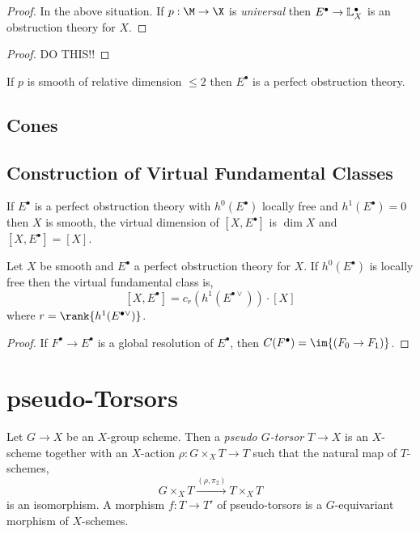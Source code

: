 \documentclass[12pt]{article}
\begin{document}
\begin{proof}
In the above situation. If $p : \M \to \X$ is \textit{universal} then $E^\bullet \to \mathbb{L}^\bullet_X$ is an obstruction theory for $X$.
\end{proof}

\begin{proof}
DO THIS!!
\end{proof}

\begin{cor}
If $p$ is smooth of relative dimension $\le 2$ then $E^\bullet$ is a perfect obstruction theory. 
\end{cor}
\subsection{Cones}

\subsection{Construction of Virtual Fundamental Classes}


\begin{prop}
If $E^\bullet$ is a perfect obstruction theory with $h^0(E^\bullet)$ locally free and $h^1(E^\bullet) = 0$ then $X$ is smooth, the virtual dimension of $[X, E^\bullet]$ is $\dim{X}$ and $[X, E^\bullet] = [X]$.
\end{prop}

\begin{prop}
Let $X$ be smooth and $E^\bullet$ a perfect obstruction theory for $X$. If $h^0(E^\bullet)$ is locally free then the virtual fundamental class is,
\[ [X, E^\bullet] = c_r(h^1(E^{\bullet \vee})) \cdot [X] \]
where $r = \rank{h^1(E^{\bullet \vee})}$.
\end{prop}

\begin{proof}
If $F^\bullet \to E^\bullet$ is a global resolution of $E^\bullet$, then $C(F^\bullet) = \im{(F_0 \to F_1)}$.
\end{proof}

\section{pseudo-Torsors}

\begin{defn}
Let $G \to X$ be an $X$-group scheme. Then a \textit{pseudo $G$-torsor} $T \to X$ is an $X$-scheme together with an $X$-action $\rho : G \times_X T \to T$ such that the natural map of $T$-schemes,
\[ G \times_X T \xrightarrow{(\rho, \pi_2)} T \times_X T \]
is an isomorphism. A morphism $f : T \to T'$ of pseudo-torsors is a $G$-equivariant morphism of $X$-schemes.
\end{defn}
\end{document}

